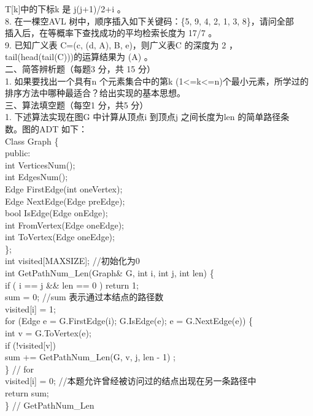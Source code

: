 \begin{question}
T[k]中的下标k 是     j(j+1)/2+i       。\\
8. 在一棵空AVL 树中，顺序插入如下关键码：\{5, 9, 4, 2, 1, 3, 8\}，请问全部\\
插入后，在等概率下查找成功的平均检索长度为  17/7     。\\
9. 已知广义表 C=(c, (d, A), B, e)，则广义表C 的深度为   2     ，\\
tail(head(tail(C)))的运算结果为  (A)     。\\
二、简答辨析题（每题3 分，共 15 分）\\
1. 如果要找出一个具有n 个元素集合中的第k (1<=k<=n)个最小元素，所学过的\\
排序方法中哪种最适合？给出实现的基本思想。\\
三、算法填空题（每空1 分，共5 分）\\
1. 下述算法实现在图G 中计算从顶点i 到顶点j 之间长度为len 的简单路径条\\
数。图的ADT 如下：\\
Class Graph \{\\
public:\\
int VerticesNum();\\
int EdgesNum();\\
Edge FirstEdge(int oneVertex);\\
Edge NextEdge(Edge preEdge);\\
bool IsEdge(Edge onEdge);\\
int FromVertex(Edge oneEdge);\\
int ToVertex(Edge oneEdge);\\
\};\\
int visited[MAXSIZE];     //初始化为0\\
int GetPathNum\_Len(Graph\& G, int i, int j, int len)  \{\\
if (      i == j \&\& len == 0         )  return 1;\\
sum = 0;             //sum 表示通过本结点的路径数\\
visited[i] = 1;\\
for (Edge e = G.FirstEdge(i); G.IsEdge(e); e = G.NextEdge(e)) \{\\
int v = G.ToVertex(e);\\
if (!visited[v])\\
sum += GetPathNum\_Len(G, v, j, len - 1) ;\\
\} // for\\
visited[i] = 0; //本题允许曾经被访问过的结点出现在另一条路径中\\
return sum;\\
\} // GetPathNum\_Len\\

\end{question}
